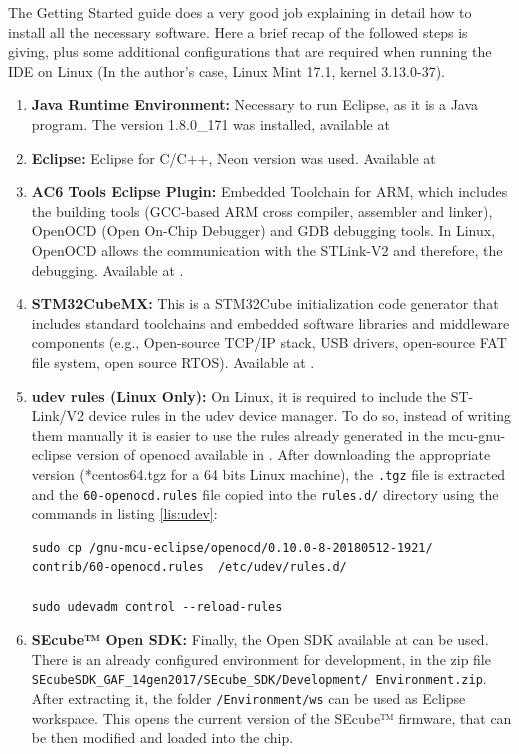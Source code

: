 The Getting Started guide does a very good job explaining in detail how to install all the necessary software. Here a brief recap of the followed steps is giving, plus some additional configurations that are required when running the IDE on Linux (In the author's case, Linux Mint 17.1, kernel 3.13.0-37).


\begin{enumerate}
\setlength\itemsep{0pt}
\item \textbf{Java Runtime Environment:} Necessary to run Eclipse, as it is a Java program. The version 1.8.0\_171 was installed, available at \cite{java}

\item \textbf{Eclipse:} Eclipse for C/C++, Neon version was used. Available at \cite{eclipse}

\item \textbf{AC6 Tools Eclipse Plugin: }Embedded Toolchain for ARM, which includes the building tools (GCC-based ARM cross compiler, assembler and linker), OpenOCD (Open On-Chip Debugger) and GDB debugging tools. In Linux, OpenOCD allows the communication with the STLink-V2 and therefore, the debugging. Available at \cite{ac6}.

\item \textbf{STM32CubeMX: }This is a STM32Cube initialization code generator that includes standard toolchains and embedded software libraries and middleware components (e.g., Open-source TCP/IP stack, USB drivers, open-source FAT file system, open source RTOS). Available at \cite{cubemx}.

\item \textbf{udev rules (Linux Only): }On Linux, it is required to include the ST-Link/V2 device rules in the udev device manager. To do so, instead of writing them manually it is easier to use the rules already generated in the mcu-gnu-eclipse version of openocd available in \cite{mcu}. After downloading the appropriate version (*centos64.tgz for a 64 bits Linux machine), the \texttt{.tgz} file is extracted and the \texttt{60-openocd.rules} file copied into the \texttt{rules.d/} directory using the commands in listing \ref{lis:udev}:

\begin{lstlisting}[float=htb, basicstyle=\ttfamily, frame=tb, caption={Including STLink rules to udev manager in Linux}, label = {lis:udev}]
sudo cp /gnu-mcu-eclipse/openocd/0.10.0-8-20180512-1921/
contrib/60-openocd.rules  /etc/udev/rules.d/

sudo udevadm control --reload-rules
\end{lstlisting}


\item \textbf{SEcube™ Open SDK: }Finally, the Open SDK available at \cite{SEcubeRes} can be used. There is an already configured environment for development, in the zip file \texttt{SEcubeSDK\_GAF\_14gen2017/SEcube\_SDK/Development/ Environment.zip}. After extracting it, the folder \texttt{/Environment/ws} can be used as Eclipse workspace. This opens the current version of the SEcube™ firmware, that can be then modified and loaded into the chip.

\end{enumerate}




